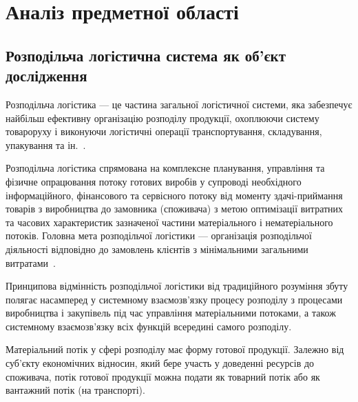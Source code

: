 \section{Аналіз предметної області}
\subsection{Розподільча логістична система як об'єкт дослідження}
Розподільча логістика --- це частина загальної логістичної системи, яка забезпечує найбільш ефективну організацію розподілу продукції, охоплюючи систему товароруху і виконуючи логістичні операції транспортування, складування, упакування та ін.~\cite{Kusluy2010}.

Розподільча логістика спрямована на комплексне планування, управління та фізичне опрацювання потоку готових виробів у супроводі необхідного інформаційного, фінансового та сервісного потоку від моменту здачі-приймання товарів з виробництва до замовника (споживача) з метою оптимізації витратних та часових характеристик зазначеної частини матеріального і нематеріального потоків.
Головна мета розподільчої логістики --- організація розподільчої діяльності відповідно до замовлень клієнтів з мінімальними загальними витратами~\cite{Kusluy2010}.

Принципова відмінність розподільчої логістики від традиційного розуміння збуту полягає насамперед у системному взаємозв'язку процесу розподілу з процесами виробництва і закупівель під час управління матеріальними потоками, а також системному взаємозв'язку всіх функцій всередині самого розподілу.

Матеріальний потік у сфері розподілу має форму готової продукції.
Залежно від суб'єкту економічних відносин, який бере участь у доведенні ресурсів до споживача, потік готової продукції можна подати як товарний потік або як вантажний потік (на транспорті).

